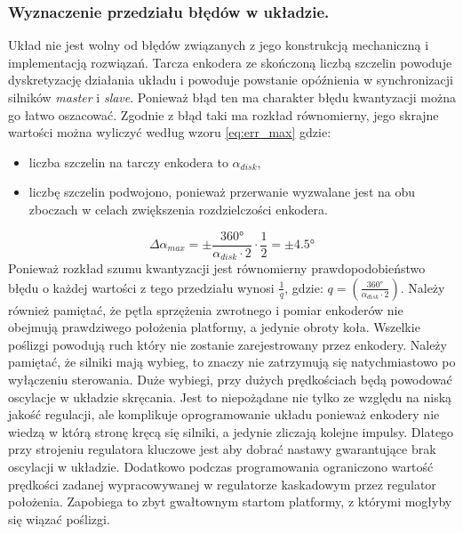\documentclass[11pt]{article}
\begin{document}
\subsubsection{Wyznaczenie przedziału błędów w układzie.} \label{sec:err}
Układ nie jest wolny od błędów związanych z jego konstrukcją mechaniczną i implementacją rozwiązań.
Tarcza enkodera ze skończoną liczbą szczelin powoduje dyskretyzację działania układu i powoduje powstanie opóźnienia w synchronizacji silników \textit{master} i \textit{slave}.
Ponieważ błąd ten ma charakter błędu kwantyzacji można go łatwo oszacować.
Zgodnie z %
błąd taki ma rozkład równomierny, jego skrajne wartości można wyliczyć według wzoru \ref{eq:err_max} gdzie:
\begin{itemize}
	\item liczba szczelin na tarczy enkodera to $ \alpha_{disk} $,
	\item liczbę szczelin podwojono, ponieważ przerwanie wyzwalane jest na obu zboczach w celach zwiększenia rozdzielczości enkodera.
\end{itemize}

\begin{equation}
	\label{eq:err_max}
	\Delta \alpha_{max} = \pm \frac{\ang{360}}{\alpha_{disk} \cdot 2} \cdot \frac{1}{2} = \pm \ang{4,5}
\end{equation}
Ponieważ rozkład szumu kwantyzacji jest równomierny prawdopodobieństwo błędu o każdej wartości z tego przedziału wynosi $ \frac{1}{q} $, gdzie: $ q = {\left( \frac{\ang{360}}{\alpha_{disk} \cdot 2} \right)} $.
Należy również pamiętać, że pętla sprzężenia zwrotnego i pomiar enkoderów nie obejmują prawdziwego położenia platformy, a jedynie obroty koła.
Wszelkie poślizgi powodują ruch który nie zostanie zarejestrowany przez enkodery.
Należy pamiętać, że silniki mają wybieg, to znaczy nie zatrzymują się natychmiastowo po wyłączeniu sterowania.
Duże wybiegi, przy dużych prędkościach będą powodować oscylacje w układzie skręcania.
Jest to niepożądane nie tylko ze względu na niską jakość regulacji, ale komplikuje oprogramowanie układu ponieważ enkodery nie wiedzą w którą stronę kręcą się silniki, a jedynie zliczają kolejne impulsy.
Dlatego przy strojeniu regulatora kluczowe jest aby dobrać nastawy gwarantujące brak oscylacji w układzie.
Dodatkowo podczas programowania ograniczono wartość prędkości zadanej wypracowywanej w regulatorze kaskadowym przez regulator położenia.
Zapobiega to zbyt gwałtownym startom platformy, z którymi mogłyby się wiązać poślizgi.
\end{document}
